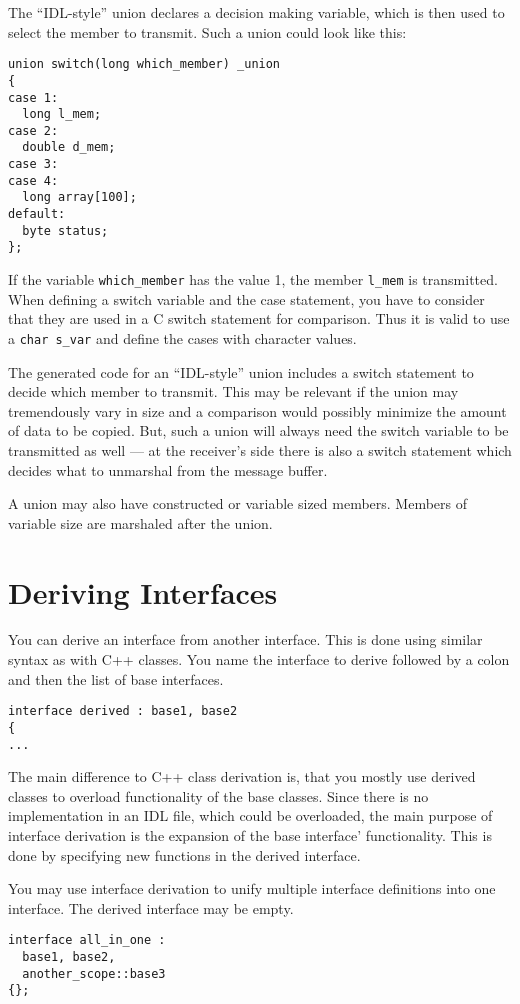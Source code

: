 The ``IDL-style'' union declares a decision making variable, which is then
used to select the member to transmit. Such a union could look like this:
\begin{verbatim}
union switch(long which_member) _union
{
case 1:
  long l_mem;
case 2:
  double d_mem;
case 3:
case 4:
  long array[100];
default:
  byte status;
};
\end{verbatim}
If the variable \verb|which_member| has the value 1, the member \verb|l_mem|
is transmitted. When defining a switch variable and the case statement, you
have to consider that they are used in a C switch statement for comparison.
Thus it is valid to use a \verb|char s_var| and define the cases with character
values.

The generated code for an ``IDL-style'' union includes a switch statement to 
decide which member to transmit. This may be relevant if the union may
tremendously vary in size and a comparison would possibly minimize the
amount of data to be copied. But, such a union will always need the switch
variable to be transmitted as well --- at the receiver's side there is 
also a switch statement which decides what to unmarshal from the message 
buffer.

A union may also have constructed or variable sized members. Members of
variable size are marshaled after the union.

\section{Deriving Interfaces}
You can derive an interface from another interface. This is done
using similar syntax as with C++ classes. You name the interface to derive
followed by a colon and then the list of base interfaces.
\begin{verbatim}
interface derived : base1, base2
{
...
\end{verbatim}

The main difference to C++ class derivation is, that you mostly use derived 
classes to overload functionality of the base classes. Since there is no
implementation in an IDL file, which could be overloaded, the main purpose
of interface derivation is the expansion of the base interface' functionality.
This is done by specifying new functions in the derived interface.

You may use interface derivation to unify multiple interface definitions
into one interface. The derived interface may be empty. 
\begin{verbatim}
interface all_in_one : 
  base1, base2, 
  another_scope::base3
{};
\end{verbatim}


